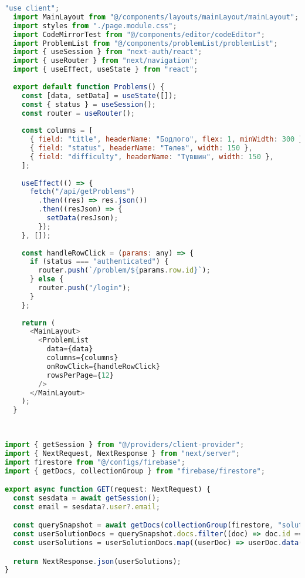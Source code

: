 \begin{lstlisting}[language=JavaScript, frame=single, caption={Бодлогуудыг cache-ээс fetch хийх component}]
  "use client";
  import MainLayout from "@/components/layouts/mainLayout/mainLayout";
  import styles from "./page.module.css";
  import CodeMirrorTest from "@/components/editor/codeEditor";
  import ProblemList from "@/components/problemList/problemList";
  import { useSession } from "next-auth/react";
  import { useRouter } from "next/navigation";
  import { useEffect, useState } from "react";
  
  export default function Problems() {
    const [data, setData] = useState([]);
    const { status } = useSession();
    const router = useRouter();
  
    const columns = [
      { field: "title", headerName: "Бодлого", flex: 1, minWidth: 300 },
      { field: "status", headerName: "Төлөв", width: 150 },
      { field: "difficulty", headerName: "Түвшин", width: 150 },
    ];
  
    useEffect(() => {
      fetch("/api/getProblems")
        .then((res) => res.json())
        .then((resJson) => {
          setData(resJson);
        });
    }, []);
  
    const handleRowClick = (params: any) => {
      if (status === "authenticated") {
        router.push(`/problem/${params.row.id}`);
      } else {
        router.push("/login");
      }
    };
  
    return (
      <MainLayout>
        <ProblemList
          data={data}
          columns={columns}
          onRowClick={handleRowClick}
          rowsPerPage={12}
        />
      </MainLayout>
    );
  }
  
    
\end{lstlisting}

\begin{lstlisting}[language=JavaScript, frame=single, caption={CollectionGroup query бичиж хэрэглэгчийн бодолтуудыг авч буй route}]
import { getSession } from "@/providers/client-provider";
import { NextRequest, NextResponse } from "next/server";
import firestore from "@/configs/firebase";
import { getDocs, collectionGroup } from "firebase/firestore";

export async function GET(request: NextRequest) {
  const sesdata = await getSession();
  const email = sesdata?.user?.email;

  const querySnapshot = await getDocs(collectionGroup(firestore, "solutions"));
  const userSolutionDocs = querySnapshot.docs.filter((doc) => doc.id === email);
  const userSolutions = userSolutionDocs.map((userDoc) => userDoc.data());

  return NextResponse.json(userSolutions);
}

\end{lstlisting}

